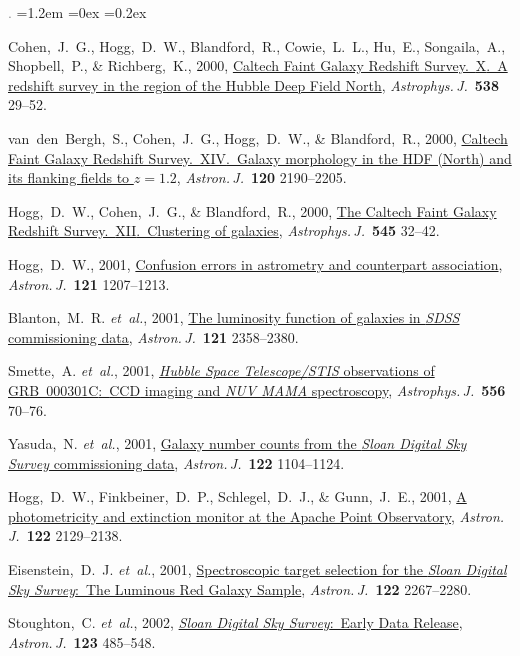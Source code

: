 \documentclass[10pt,letterpaper]{article}
\newcommand{\acronym}[1]{{\small{#1}}}
\newcommand{\foreign}[1]{\textsl{#1}}
\newcommand{\etal}{\foreign{et~al.}}
\newcommand{\project}[1]{\textsl{#1}}
\newcommand{\doi}[2]{\href{http://dx.doi.org/#1}{{#2}}}
\newcommand{\deemph}[1]{\textcolor{grey}{\footnotesize{#1}}}
\newcommand{\pubnumber}[1]{\deemph{{#1}.}}
\newcounter{refpubnum}
\newcommand{\hogglist}{%
    \rightmargin=0in
    \leftmargin=1.2em
    \topsep=0ex
    \partopsep=0pt
    \itemsep=0.2ex
    \parsep=0pt
    \itemindent=-1.0\leftmargin
    \listparindent=0.0\leftmargin
    \settowidth{\labelsep}{~}
    \usecounter{refpubnum}
  }
\begin{document}
\begin{list}{\pubnumber{\therefpubnum}}{\hogglist}
\item\label{pub:Cohen2000}
Cohen,~J.~G., Hogg,~D.~W., Blandford,~R., Cowie,~L.~L., Hu,~E., Songaila,~A., Shopbell,~P., \& Richberg,~K., 2000,
\doi{10.1086/309096}{Caltech Faint Galaxy Redshift Survey.\ \acronym{X}.\ A redshift survey in the region of the Hubble Deep Field North},
\textit{Astrophys.\,J.}\ \textbf{538} 29--52.
\item
van~den~Bergh,~S., Cohen,~J.~G., Hogg,~D.~W., \& Blandford,~R., 2000,
\doi{10.1086/316828}{Caltech Faint Galaxy Redshift Survey.\ \acronym{XIV}.\ Galaxy morphology in the HDF (North) and its flanking fields to $z=1.2$},
\textit{Astron.\,J.}\ \textbf{120} 2190--2205.
\item
Hogg,~D.~W., Cohen,~J.~G., \& Blandford,~R., 2000,
\doi{10.1086/317779}{The Caltech Faint Galaxy Redshift Survey.\ \acronym{XII}.\ Clustering of galaxies},
\textit{Astrophys.\,J.}\ \textbf{545} 32--42.
\item
Hogg,~D.~W., 2001,
\doi{10.1086/318736}{Confusion errors in astrometry and counterpart association},
\textit{Astron.\,J.}\ \textbf{121} 1207--1213.
\item
Blanton,~M.~R. \etal, 2001,
\doi{10.1086/320405}{The luminosity function of galaxies in \project{\acronym{SDSS}} commissioning data},
\textit{Astron.\,J.}\ \textbf{121} 2358--2380.
\item
Smette,~A. \etal, 2001,
\doi{10.1086/321585}{\project{Hubble Space Telescope/\acronym{STIS}} observations of \acronym{GRB~000301C}:\ \acronym{CCD} imaging and \project{\acronym{NUV MAMA}} spectroscopy},
\textit{Astrophys.\,J.}\ \textbf{556} 70--76.
\item
Yasuda,~N. \etal, 2001,
\doi{10.1086/322093}{Galaxy number counts from the \project{Sloan Digital Sky Survey} commissioning data},
\textit{Astron.\,J.}\ \textbf{122} 1104--1124.
\item\label{pub:Hogg2001}
Hogg,~D.~W., Finkbeiner,~D.~P., Schlegel,~D.~J., \& Gunn,~J.~E., 2001,
\doi{10.1086/323103}{A photometricity and extinction monitor at the Apache Point Observatory},
\textit{Astron.\,J.}\ \textbf{122} 2129--2138.
\item
Eisenstein,~D.~J. \etal, 2001,
\doi{10.1086/323717}{Spectroscopic target selection for the \project{Sloan Digital Sky Survey}:\ The Luminous Red Galaxy Sample},
\textit{Astron.\,J.}\ \textbf{122} 2267--2280.
\item
Stoughton,~C. \etal, 2002,
\doi{10.1086/324741}{\project{Sloan Digital Sky Survey}:\ Early Data Release},
\textit{Astron.\,J.}\ \textbf{123} 485--548.
\item

\end{list}
\end{document}
